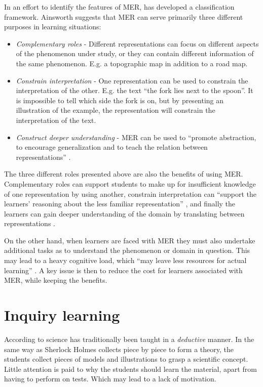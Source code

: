 In an effort to identify the features of MER, \citet{ainsworth1999functions} has developed a classification framework. Ainsworth suggests that MER can serve primarily three different purposes in learning situations:
\begin{itemize}
\item{} \emph{Complementary roles} - Different representations can focus on different aspects of the phenomenon under study, or they can contain different information of the same phenomenon. E.g. a topographic map in addition to a road map. 
\item{} \emph{Constrain interpretation} - One representation can be used to constrain the interpretation of the other. E.g. the text “the fork lies next to the spoon”. It is impossible to tell which side the fork is on, but by presenting an illustration of the example, the representation will constrain the interpretation of the text. 
\item{} \emph{Construct deeper understanding} - MER can be used to “promote abstraction, to encourage generalization and to teach the relation between representations” \citep{ainsworth1999functions}. 
\end{itemize}

The three different roles presented above are also the benefits of using MER. Complementary roles can support students to make up for insufficient knowledge of one representation by using another, constrain interpretation can “support the learners’ reasoning about the less familiar representation” \citet{ainsworth1999functions}, and finally the learners can gain deeper understanding of the domain by translating between representations \citep{van2006supporting}. 

On the other hand, when learners are faced with MER they must also undertake additional tasks as to understand the phenomenon or domain in question. This may lead to a heavy cognitive load, which “may leave less resources for actual learning” \citetext{Sweller, 1988, 1989, referenced in \citealp{van2006supporting}}. A key issue is then to reduce the cost for learners associated with MER, while keeping the benefits. 

\section{Inquiry learning}
According to \citet{prince2006inductive} science has traditionally been taught in a \textit{deductive} manner. In the same way as Sherlock Holmes collects piece by piece to form a theory, the students collect pieces of models and illustrations to grasp a scientific concept. Little attention is paid to why the students should learn the material, apart from having to perform on tests. Which may lead to a lack of motivation.

